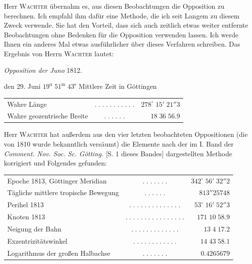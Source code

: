 \par\indent Herr \textsc{Wachter} übernahm es, aus diesen Beobachtungen die Opposition zu berechnen. Ich empfahl ihm dafür eine Methode, die ich seit Langem zu diesem Zweck verwende. Sie hat den Vorteil, dass sich auch zeitlich etwas weiter entfernte Beobachtungen ohne Bedenken für die Opposition verwenden lassen. Ich werde Ihnen ein anderes Mal etwas ausführlicher über dieses Verfahren schreiben. Das Ergebnis von Herrn \textsc{Wachter} lautet:

\begin{center}
\emph{Opposition der Juno} 1812.
\end{center}

den 29. Juni $19^{\mathrm u}\;51^{\mathrm m}\;43^{\mathrm s}$ Mittlere Zeit in Göttingen

\begin{center}\fontsize{10}{12}\selectfont\setlength{\tabcolsep}{2pt}\renewcommand{\arraystretch}{1.15}\begin{tabular}{lcr}
Wahre Länge & $.\;.\;.\;.\;.\;.\;.\;.\;.\;.\;.$ & $278^\circ\;15'\;21''3$\\
Wahre geozentrische Breite & $.\;.\;.\;.\;.\;.$ & $18\;36\;56.9$\\
\end{tabular}\end{center}

\par\indent Herr \textsc{Wachter} hat außerdem aus den vier letzten beobachteten Oppositionen (die von 1810 wurde bekanntlich versäumt) die Elemente nach der im I. Band der \emph{Comment. Nov. Soc. Sc. Götting.} [S. 1 dieses Bandes] dargestellten Methode korrigiert und Folgendes gefunden:
\begin{center}\fontsize{9}{11}\selectfont\setlength{\tabcolsep}{2pt}\renewcommand{\arraystretch}{1.15}\begin{tabular}{lcr}
Epoche 1813, Göttinger Meridian & $.\;.\;.\;.\;.\;.\;.$ & $342^\circ\;56'\;32''2$\\
Tägliche mittlere tropische Bewegung & $.\;.\;.\;.\;.\;.$ & $813''25748$\\
Perihel 1813 & $.\;.\;.\;.\;.\;.\;.\;.\;.\;.\;.\;.\;.\;.$ & $53^\circ\;16'\;52''3$\\
Knoten 1813 & $.\;.\;.\;.\;.\;.\;.\;.\;.\;.\;.\;.\;.\;.\;.\;.$ & $171\;10\;58.9$\\
Neigung der Bahn & $.\;.\;.\;.\;.\;.\;.\;.\;.\;.\;.\;.\;.$ & $13\;4\;17.2$\\
Exzentrizitätswinkel & $.\;.\;.\;.\;.\;.\;.\;.\;.\;.\;.\;.$ & $14\;43\;58.1$\\
Logarithmus der großen Halbachse & $.\;.\;.\;.\;.\;.\;.$ & $0.4265679$\\
\end{tabular}\end{center}

